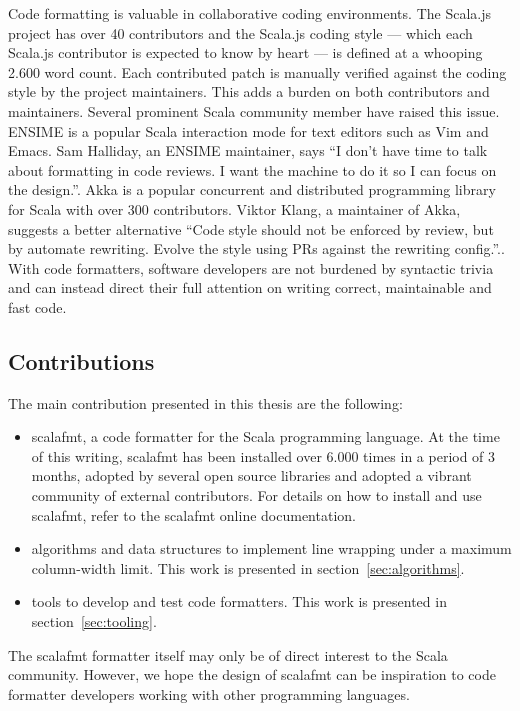 Code formatting is valuable in collaborative coding environments.
The Scala.js project\autocite{_scala.js_????} has over 40 contributors and the Scala.js coding style\autocite{doeraene_scala.js_2015} --- which each Scala.js contributor is expected to know by heart --- is defined at a whooping 2.600 word count.
Each contributed patch is manually verified against the coding style by the project maintainers.
This adds a burden on both contributors and maintainers.
Several prominent Scala community member have raised this issue.
ENSIME\autocite{_ensime_????} is a popular Scala interaction mode for text editors such as Vim and Emacs.
Sam Halliday, an ENSIME maintainer, says ``I don't have time to talk about formatting in code reviews. I want the machine to do it so I can focus on the design.''\autocite{halliday_i_2016-1}.
Akka\autocite{_akka_????} is a popular concurrent and distributed programming library for Scala with over 300 contributors.
Viktor Klang, a maintainer of Akka, suggests a better alternative ``Code style should not be enforced by review, but by automate rewriting. Evolve the style using PRs against the rewriting config.''.\autocite{klang_code_2016}.
With code formatters, software developers are not burdened by syntactic trivia and can instead direct their full attention on writing correct, maintainable and fast code.

\subsection{Contributions}
The main contribution presented in this thesis are the following:
\begin{itemize}
  \item scalafmt, a code formatter for the Scala programming language.
    At the time of this writing, scalafmt has been installed over 6.000 times in a period of 3 months, adopted by several open source libraries and adopted a vibrant community of external contributors.
    For details on how to install and use scalafmt, refer to the scalafmt online documentation\autocite{geirsson_scalafmt_2016}.

  \item algorithms and data structures to implement line wrapping under a maximum column-width limit.
    This work is presented in section~\ref{sec:algorithms}.
  \item tools to develop and test code formatters.
    This work is presented in section~\ref{sec:tooling}.
\end{itemize}
The scalafmt formatter itself may only be of direct interest to the Scala community.
However, we hope the design of scalafmt can be inspiration to code formatter developers working with other programming languages.


